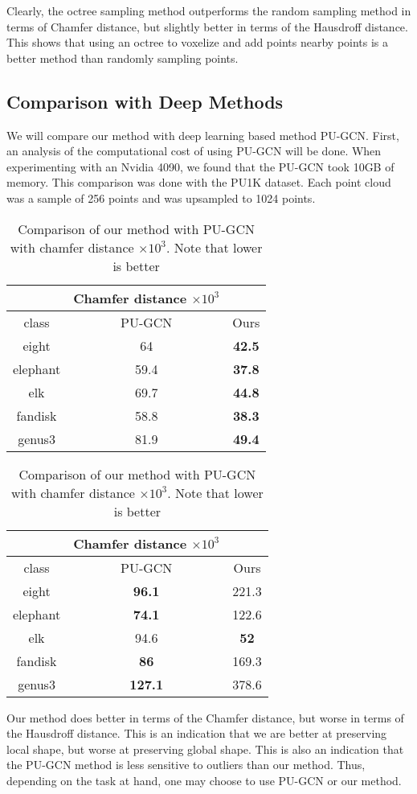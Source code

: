 Clearly, the octree sampling method outperforms the random sampling method in terms of Chamfer distance, but slightly better in terms of the Hausdroff distance.
This shows that using an octree to voxelize and add points nearby points is a better method than randomly sampling points.

\subsection{Comparison with Deep Methods}

We will compare our method with deep learning based method PU-GCN\cite{PU-GCN}.
First, an analysis of the computational cost of using PU-GCN will be done. 
When experimenting with an Nvidia 4090, we found that the PU-GCN took 10GB of memory.
This comparison was done with the PU1K dataset. Each point cloud was a sample of 256 points and was upsampled to 1024 points. 

\begin{table}[H]
\centering
\begin{tabular}{ccc}
	& Chamfer distance $\times 10^3$ &\\
	\hline
	class & PU-GCN & Ours \\
	\hline
	eight & {64} & \textbf{42.5} \\ 
	elephant & {59.4} & \textbf{37.8} \\
	elk & {69.7} & \textbf{44.8} \\  
	fandisk & {58.8} & \textbf{38.3} \\  
	genus3 & {81.9} & \textbf{49.4}  \\
\end{tabular}
\caption{Comparison of our method with PU-GCN with chamfer distance $\times 10^3$. Note that lower is better}
\end{table}


\begin{table}[H]
\centering
\begin{tabular}{ccc}
	& Chamfer distance $\times 10^3$ &\\
	\hline
	class & PU-GCN & Ours \\
	\hline
	eight & \textbf{96.1} & {221.3} \\ 
	elephant &  \textbf{74.1}& {122.6} \\
	elk & {94.6} & \textbf{52} \\  
	fandisk & \textbf{86} & {169.3} \\  
	genus3 & \textbf{127.1} & {378.6}  \\
\end{tabular}
\caption{Comparison of our method with PU-GCN with chamfer distance $\times 10^3$. Note that lower is better}
\end{table}

Our method does better in terms of the Chamfer distance, but worse in terms of the Hausdroff distance.
This is an indication that we are better at preserving local shape, but worse at preserving global shape.
This is also an indication that the PU-GCN method is less sensitive to outliers than our method.
Thus, depending on the task at hand, one may choose to use PU-GCN or our method.


